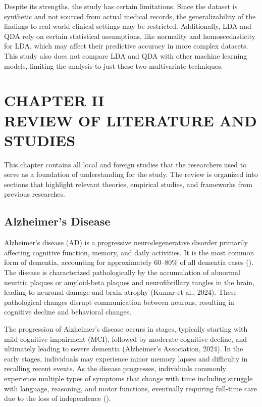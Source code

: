 \documentclass[12pt]{article}
\begin{document}
Despite its strengths, the study has certain limitations. Since the dataset is synthetic and not sourced from actual medical records, the generalizability of the findings to real-world clinical settings may be restricted. Additionally, LDA and QDA rely on certain
statistical assumptions, like normality and homoscedasticity for LDA, which may affect their predictive accuracy in more complex datasets. This study also does not compare LDA and QDA with other machine learning models, limiting the analysis to just these two multivariate
techniques. 

\newpage
\section{CHAPTER II \\ REVIEW OF LITERATURE AND STUDIES}

This chapter contains all local and foreign studies that the 
researchers used to serve as a foundation of understanding
for the study. The review is organized into sections 
that highlight relevant theories, empirical studies, and 
frameworks from previous researches. 

\subsection{Alzheimer's Disease}
\noindent

Alzheimer’s disease (AD) is a progressive neurodegenerative disorder primarily affecting cognitive function, memory, and daily activities. It is the most common form of dementia, accounting for approximately 60–80\% of all dementia cases (\cite{alzheimers2024}). 
The disease is characterized pathologically by the accumulation of abnormal neuritic plaques or amyloid-beta plaques and neurofibrillary tangles in the brain, leading to neuronal damage and brain atrophy (Kumar et al., 2024). These pathological changes disrupt communication between neurons, 
resulting in cognitive decline and behavioral changes. 

The progression of Alzheimer’s disease occurs in stages, typically starting with mild cognitive impairment (MCI), followed by moderate cognitive decline, and ultimately leading to severe dementia (Alzheimer’s Association, 2024). In the early stages, individuals may experience minor memory lapses 
and difficulty in recalling recent events. As the disease progresses, individuals commonly experience multiple types of symptoms that change with time including struggle with language, reasoning, and motor functions, eventually requiring full-time care due to the loss of independence (\cite{Dubois2016}).
\end{document}
